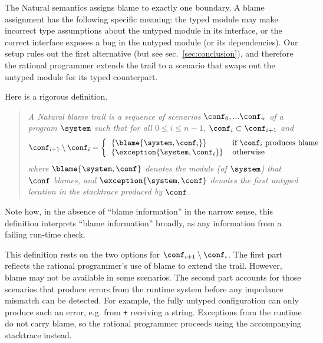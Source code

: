 
The Natural semantics assigns blame to exactly one boundary.  A blame assignment
has the following specific meaning: the typed module may make incorrect type
assumptions about the untyped module in its interface, or the correct
interface exposes a bug in the untyped module (or its dependencies). Our setup rules out the first
alternative (but see sec.~\ref{sec:conclusion}), and therefore the rational
programmer extends the trail to a scenario that swaps out the untyped
module for its typed counterpart.



Here is a rigorous definition. 
\begin{quote}
\it A \emph{Natural blame trail} is a sequence of scenarios $\conf_0,...\conf_n$ of
a program $\system$ such that for all $0 \leq i \leq n - 1$, $\conf_i \subset
\conf_{i+1}$ and
\[ \conf_{i+1} \setminus \conf_i = %
\left\{ %
\begin{tabular}{ll} %
$\{\blame{\system, \conf_i}\}$      & if $\conf_i$ produces blame \\ %
$\{\exception{\system, \conf_i}\}$  & otherwise \\ %
\end{tabular} \right. %
\]
where $\blame{\system, \conf}$ denotes the module (of $\system$) that $\conf$ blames,
and $\exception{\system, \conf}$ denotes the first untyped location in the stacktrace produced by $\conf$.
\end{quote}
Note how, in the absence of ``blame information'' in the narrow sense, 
this definition interprets ``blame information'' broadly, as
any information from a failing run-time check.  

This definition rests on the two options for $\conf_{i+1} \setminus \conf_i$.
The first part reflects the rational programmer's use of blame to extend the
trail. However, blame may not be available in some scenarios. The second part
accounts for those scenarios that produce errors from the runtime system before
any impedance mismatch can be detected. For example, the fully untyped
configuration can only produce such an error, e.g. from {\tt +} receiving a
string. Exceptions from the runtime do not carry blame, so
the rational programmer proceeds using the accompanying stacktrace instead.

